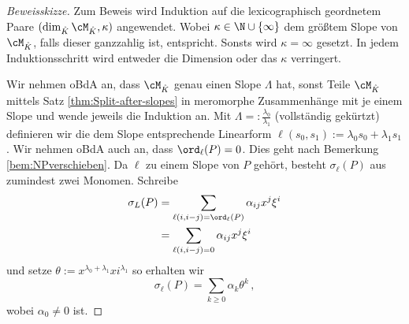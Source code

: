 \begin{proof}[Beweisskizze]
Zum Beweis wird Induktion auf die lexicographisch geordnetem Paare
$(\dim_{\hat K}\cM_{\hat K},\kappa)$ angewendet. Wobei
$\kappa\in\N\cup\{\infty\}$ dem größtem Slope von $\cM_{\hat K}$, falls dieser
ganzzahlig ist, entspricht. Sonsts wird $\kappa=\infty$ gesetzt. In jedem
Induktionsschritt wird entweder die Dimension oder das $\kappa$ verringert.

\begin{comment}
TODO: Induktionsanfang und -schritt kennzeichnen
\end{comment}
Wir nehmen oBdA an, dass $\cM_{\hat K}$ genau einen Slope $\Lambda$ hat, sonst
Teile $\cM_{\hat K}$ mittels Satz \ref{thm:Split-after-slopes} in meromorphe
Zusammenhänge mit je einem Slope und wende jeweils die Induktion an.
Mit $\Lambda=:\frac{\lambda_0}{\lambda_1}$ (vollständig gekürtzt) definieren
wir die dem Slope entsprechende Linearform
$\ell(s_0,s_1):=\lambda_0s_0+\lambda_1s_1$.  
Wir nehmen oBdA auch an, dass $\ord_\ell(P)=0$. Dies geht nach Bemerkung
\ref{bem:NPverschieben}.
Da $\ell$ zu einem Slope von
$P$ gehört, besteht $\sigma_\ell(P)$ aus zumindest zwei Monomen.
Schreibe
\begin{align*}
\sigma_L(P)&=\sum_{\ell(i,i-j)=\ord_\ell(P)}\alpha_{ij}x^j\xi^i\\
  &=\sum_{\ell(i,i-j)=0}\alpha_{ij}x^j\xi^i
\end{align*}
und setze $\theta:=x^{\lambda_0+\lambda_1}xi^{\lambda_1}$ so erhalten wir
\[
\sigma_\ell(P) = \sum_{k\geq 0}\alpha_k\theta^k \,,
\]
wobei $\alpha_0\neq0$ ist.


\end{proof}
